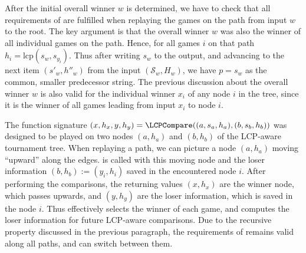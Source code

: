 \documentclass[a4paper]{myjournal}
\newcommand{\lcp}{\mathrm{lcp}}
\newcommand{\Strings}{\mathcal{S}}
\begin{document}
After the initial overall winner $w$ is determined, we have to check that all
requirements of \LCPCompare are fulfilled when replaying the games on the path
from input $w$ to the root.  The key argument is that the overall winner $w$ was
also the winner of all individual games on the path.  Hence, for all games $i$
on that path $h_i = \lcp(s_w,s_{y_i})$.  Thus after writing $s_w$ to the output,
and advancing to the next item $(s'_w,h''_w)$ from the input $(\Strings_w,H_w)$,
we have $p = s_w$ as the common, smaller predecessor string.  The previous
discussion about the overall winner $w$ is also valid for the individual winner
$x_i$ of any node $i$ in the tree, since it is the winner of all games leading
from input $x_i$ to node $i$.

The function signature $(x,h_x,y,h_y) = \LCPCompare((a,s_a,h_a),(b,s_b,h_b))$
was designed to be played on two nodes $(a,h_a)$ and $(b,h_b)$ of the LCP-aware
tournament tree. When replaying a path, we can picture a node $(a,h_a)$ moving
``upward'' along the edges. \LCPCompare is called with this moving node and the
loser information $(b,h_b) := (y_i,h_i)$ saved in the encountered node $i$.
After performing the comparisons, the returning values $(x,h_x)$ are the winner
node, which passes upwards, and $(y,h_y)$ are the loser information, which is
saved in the node $i$.  Thus \LCPCompare effectively selects the winner of each
game, and computes the loser information for future LCP-aware comparisons.  Due
to the recursive property discussed in the previous paragraph, the requirements
of \LCPCompare remains valid along all paths, and \LCPCompare can switch between
them.
\end{document}

